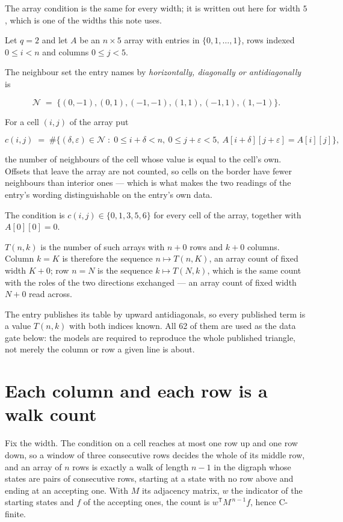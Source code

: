 \documentclass[11pt]{article}
\theoremstyle{definition}
\begin{document}
The array condition is the same for every width; it is written out here for width $5$, which is one of the widths this note uses.

Let $q = 2$ and let $A$ be an $n \times 5$ array with entries in $\{0,1,\dots,1\}$, rows indexed $0 \le i < n$ and columns $0 \le j < 5$.

The neighbour set the entry names by {\itshape horizontally, diagonally or antidiagonally} is

\[\mathcal{N} \;=\; \{(0,-1), (0,1), (-1,-1), (1,1), (-1,1), (1,-1)\}.\]

For a cell $(i,j)$ of the array put

\[c(i,j) \;=\; \#\bigl\{(\delta,\varepsilon)\in\mathcal{N} \;:\; 0\le i+\delta<n,\ 0\le j+\varepsilon<5,\ A[i+\delta][j+\varepsilon] = A[i][j]\bigr\},\]

the number of neighbours of the cell whose value is equal to the cell's own. Offsets that leave the array are not counted, so cells on the border have fewer neighbours than interior ones --- which is what makes the two readings of the entry's wording distinguishable on the entry's own data.

The condition is $c(i,j) \in \{0, 1, 3, 5, 6\}$ for every cell of the array, together with $A[0][0]=0$.

$T(n,k)$ is the number of such arrays with $n + 0$ rows and $k + 0$ columns. Column $k = K$ is therefore the sequence $n \mapsto T(n,K)$, an array count of fixed width $K + 0$; row $n = N$ is the sequence $k \mapsto T(N,k)$, which is the same count with the roles of the two directions exchanged --- an array count of fixed width $N + 0$ read across.

The entry publishes its table by upward antidiagonals, so every published term is a value $T(n,k)$ with both indices known. All 62 of them are used as the data gate below: the models are required to reproduce the whole published triangle, not merely the column or row a given line is about.

\section{Each column and each row is a walk count}

Fix the width. The condition on a cell reaches at most one row up and one row down, so a window of three consecutive rows decides the whole of its middle row, and an array of $n$ rows is exactly a walk of length $n-1$ in the digraph whose states are pairs of consecutive rows, starting at a state with no row above and ending at an accepting one. With $M$ its adjacency matrix, $w$ the indicator of the starting states and $f$ of the accepting ones, the count is $w^{\mathsf T}M^{\,n-1}f$, hence C-finite.
\end{document}
